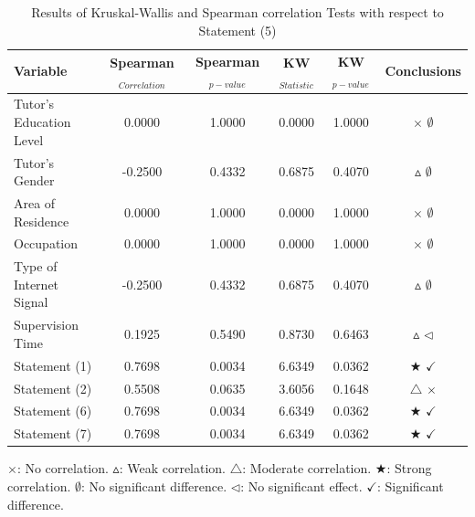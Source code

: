                 \begin{table}[h]
                    \centering
                    \caption{Results of Kruskal-Wallis and Spearman correlation Tests with respect to Statement (5)}
                    \begin{tabularx}{\textwidth}{Xccccc}
                        \toprule
                        \textbf{Variable} & \textbf{Spearman$_{Correlation}$} & \textbf{Spearman$_{p-value}$} & \textbf{KW$_{Statistic}$} & \textbf{KW$_{p-value}$} & \textbf{Conclusions} \\
                        \midrule
                        Tutor's Education Level & 0.0000 & 1.0000 & 0.0000 & 1.0000 & \(\times\) \(\emptyset\) \\
                        Tutor's Gender & -0.2500 & 0.4332 & 0.6875 & 0.4070 & \(\vartriangle\) \(\emptyset\) \\
                        Area of Residence & 0.0000 & 1.0000 & 0.0000 & 1.0000 & \(\times\) \(\emptyset\) \\
                        Occupation & 0.0000 & 1.0000 & 0.0000 & 1.0000 & \(\times\) \(\emptyset\) \\
                        Type of Internet Signal & -0.2500 & 0.4332 & 0.6875 & 0.4070 & \(\vartriangle\) \(\emptyset\) \\
                        Supervision Time & 0.1925 & 0.5490 & 0.8730 & 0.6463 & \(\vartriangle\) \(\triangleleft\) \\
                        Statement (1) & 0.7698 & 0.0034 & 6.6349 & 0.0362 & \(\bigstar\) \(\checkmark\) \\
                        Statement (2) & 0.5508 & 0.0635 & 3.6056 & 0.1648 & \(\triangle\) \(\times\) \\
                        Statement (6) & 0.7698 & 0.0034 & 6.6349 & 0.0362 & \(\bigstar\) \(\checkmark\) \\
                        Statement (7) & 0.7698 & 0.0034 & 6.6349 & 0.0362 & \(\bigstar\) \(\checkmark\) \\
                        \bottomrule
                    \end{tabularx}
                    \label{table:kruskal-spearman-results}
                    \parbox{\textwidth}{\footnotesize 
                        \(\times\): No correlation. \(\vartriangle\): Weak correlation. \(\triangle\): Moderate correlation. \(\bigstar\): Strong correlation. \(\emptyset\): No significant difference. \(\triangleleft\): No significant effect. \(\checkmark\): Significant difference.
                    }
                \end{table}
                
